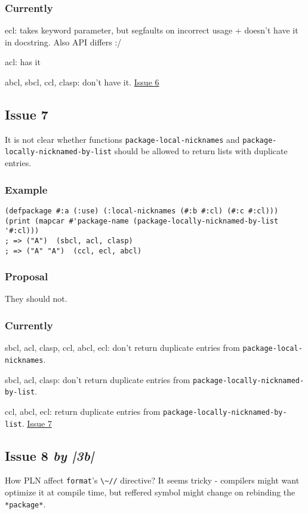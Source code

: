 \documentclass[11pt]{article}
\begin{document}
\subsubsection{Currently}
\label{sec:org38866af}
ecl: takes keyword parameter, but segfaults on incorrect usage + doesn't
have it in docstring. Also API differs :/

acl: has it

 abcl, sbcl, ccl, clasp: don't have it.
\href{./issues/6.org}{Issue 6}

\subsection{Issue 7}
\label{sec:org88e67c3}
It is not clear whether functions \texttt{package-local-nicknames} and
\texttt{package-locally-nicknamed-by-list} should be allowed to return lists with
duplicate entries.
\subsubsection{Example}
\label{sec:orgaf8a7e4}
\begin{verbatim}
(defpackage #:a (:use) (:local-nicknames (#:b #:cl) (#:c #:cl)))
(print (mapcar #'package-name (package-locally-nicknamed-by-list '#:cl)))
; => ("A")  (sbcl, acl, clasp)
; => ("A" "A")  (ccl, ecl, abcl)
\end{verbatim}
\subsubsection{Proposal}
\label{sec:orgc555be0}
They should not.
\subsubsection{Currently}
\label{sec:org5ad32cb}
sbcl, acl, clasp, ccl, abcl, ecl: don't return duplicate entries from \texttt{package-local-nicknames}.

sbcl, acl, clasp: don't return duplicate entries from \texttt{package-locally-nicknamed-by-list}.

 ccl, abcl, ecl: return duplicate entries from \texttt{package-locally-nicknamed-by-list}.
\href{./issues/7.org}{Issue 7}

\subsection{Issue 8 \emph{by |3b|}}
\label{sec:org59bbee5}
How PLN affect \texttt{format}'s \texttt{\textbackslash{}\textasciitilde{}//} directive? It seems tricky - compilers might
want optimize it at compile time, but reffered symbol might change on
rebinding the \texttt{*package*}.
\end{document}

